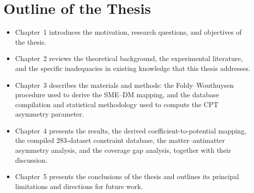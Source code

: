 \section{Outline of the Thesis}

\begin{itemize}
  \item Chapter~1 introduces the motivation, research questions, and
    objectives of the thesis.
  \item Chapter~2 reviews the theoretical background, the experimental
    literature, and the specific inadequacies in existing knowledge that
    this thesis addresses.
  \item Chapter~3 describes the materials and methods: the
    Foldy--Wouthuysen procedure used to derive the SME--DM mapping, and
    the database compilation and statistical methodology used to compute
    the CPT asymmetry parameter.
  \item Chapter~4 presents the results, the derived coefficient-to-potential
    mapping, the compiled 283-dataset constraint database, the
    matter--antimatter asymmetry analysis, and the coverage gap analysis,
    together with their discussion.
  \item Chapter~5 presents the conclusions of the thesis and outlines its
    principal limitations and directions for future work.
\end{itemize}
